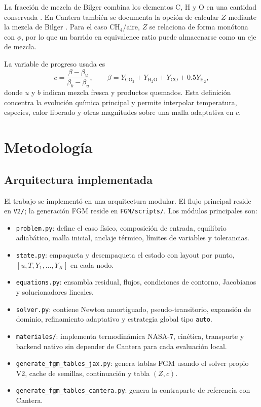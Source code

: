 \documentclass[12pt,a4paper]{article}
\begin{document}
La fracción de mezcla de Bilger combina los elementos C, H y O en una cantidad conservada \cite{Bilger1989}. En Cantera también se documenta la opción de calcular $Z$ mediante la mezcla de Bilger \cite{CanteraDocs31}. Para el caso CH$_4$/aire, $Z$ se relaciona de forma monótona con $\phi$, por lo que un barrido en equivalence ratio puede almacenarse como un eje de mezcla.

La variable de progreso usada es
\begin{equation}
  c=\frac{\beta-\beta_u}{\beta_b-\beta_u},
  \qquad
  \beta=Y_{\mathrm{CO_2}}+Y_{\mathrm{H_2O}}+Y_{\mathrm{CO}}+0.5Y_{\mathrm{H_2}},
  \label{eq:progress}
\end{equation}
donde $u$ y $b$ indican mezcla fresca y productos quemados. Esta definición concentra la evolución química principal y permite interpolar temperatura, especies, calor liberado y otras magnitudes sobre una malla adaptativa en $c$.

\section{Metodología}

\subsection{Arquitectura implementada}

El trabajo se implementó en una arquitectura modular. El flujo principal reside en \texttt{V2/}; la generación FGM reside en \texttt{FGM/scripts/}. Los módulos principales son:

\begin{itemize}
  \item \texttt{problem.py}: define el caso físico, composición de entrada, equilibrio adiabático, malla inicial, anclaje térmico, límites de variables y tolerancias.
  \item \texttt{state.py}: empaqueta y desempaqueta el estado con layout por punto, $[u,T,Y_1,\ldots,Y_K]$ en cada nodo.
  \item \texttt{equations.py}: ensambla residual, flujos, condiciones de contorno, Jacobianos y solucionadores lineales.
  \item \texttt{solver.py}: contiene Newton amortiguado, pseudo-transitorio, expansión de dominio, refinamiento adaptativo y estrategia global tipo \texttt{auto}.
  \item \texttt{materiales/}: implementa termodinámica NASA-7, cinética, transporte y backend nativo sin depender de Cantera para cada evaluación local.
  \item \texttt{generate\_fgm\_tables\_jax.py}: genera tablas FGM usando el solver propio V2, cache de semillas, continuación y tabla $(Z,c)$.
  \item \texttt{generate\_fgm\_tables\_cantera.py}: genera la contraparte de referencia con Cantera.
\end{itemize}
\end{document}
